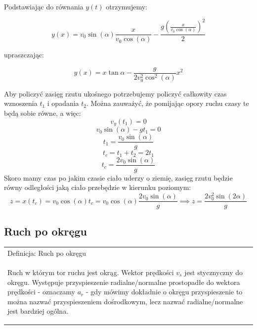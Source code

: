 \documentclass[a4paper]{article}
\newenvironment{definition}[2][Definicja]
    {
        \begin{center}
        \begin{tabular}{|p{1\textwidth}|}
        \hline
            #1: #2\\[2ex]
        \begin{em}
        \Large
    }
    { 
        \end{em}
        \\\hline
        \end{tabular} 
        \end{center}
    }
\begin{document}
    \noindent Podstawiając do równania $y(t)$ otrzymujemy:
    
    \[y(x) = v_0\sin(\alpha)\frac{x}{v_0\cos(\alpha)} - \frac{g(\frac{x}{v_0\cos(\alpha)})^2}{2}\]

    \noindent upraszczając:

    \[y(x) = x\tan{\alpha} - \frac{g}{2v_0^2\cos^2(\alpha)}x^2\]

    \noindent Aby policzyć zasięg rzutu ukośnego potrzebujemy policzyć całkowity czas wznoszenia $t_1$ i opadania $t_2$.
    Można zauważyć, że pomijając opory ruchu czasy te będą sobie równe, a więc:
    \[v_y(t_1) = 0\]
    \[v_0\sin(\alpha) - gt_1 = 0\]
    \[t_1 = \frac{v_0\sin(\alpha)}{g}\]
    \[t_c = t_1 + t_2 = 2t_1\]
    \[t_c = \frac{2v_0\sin(\alpha)}{g} \]
    Skoro mamy czas po jakim czasie ciało uderzy o ziemię, zasięg rzutu będzie równy odległości jaką ciało 
    przebędzie w kierunku poziomym:
    \[z = x(t_c) = v_0\cos(\alpha)t_c = v_0\cos(\alpha)\frac{2v_0\sin(\alpha)}{g}
    \implies z = \frac{2v_0^2\sin(2\alpha)}{g}\]

    \subsection{\LARGE Ruch po okręgu}
    \begin{definition}{Ruch po okręgu}
        Ruch w którym tor ruchu jest okrąg. Wektor prędkości $v_s$ jest stycznyczny do okręgu. 
        Występuje przyspieszenie radialne/normalne prostopadłe do wektora prędkości - oznaczamy $a_r$ 
        - gdy mówimy dokładnie o okręgu przyspieszenie to można nazwać przyspieszeniem dośrodkowym, lecz nazwać
        radialne/normalne jest bardziej ogólna.
    \end{definition}
\end{document}
